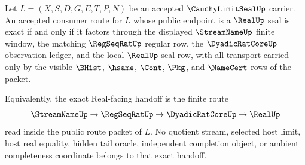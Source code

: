 \begin{theorem}
\label{thm:cauchy-limit-seal-regseqrat-real-handoff-exactness}
Let $L=(X,S,D,G,E,T,P,N)$ be an accepted $\CauchyLimitSealUp$ carrier. An accepted consumer route for $L$ whose public endpoint is a $\RealUp$ seal is exact if and only if it factors through the displayed $\StreamNameUp$ finite window, the matching $\RegSeqRatUp$ regular row, the $\DyadicRatCoreUp$ observation ledger, and the local $\RealUp$ seal row, with all transport carried only by the visible $\BHist$, $\hsame$, $\Cont$, $\Pkg$, and $\NameCert$ rows of the packet.

Equivalently, the exact Real-facing handoff is the finite route
$$
\StreamNameUp \to \RegSeqRatUp \to \DyadicRatCoreUp \to \RealUp
$$
read inside the public route packet of $L$. No quotient stream, selected host limit, host real equality, hidden tail oracle, independent completion object, or ambient completeness coordinate belongs to that exact handoff.
\end{theorem}
